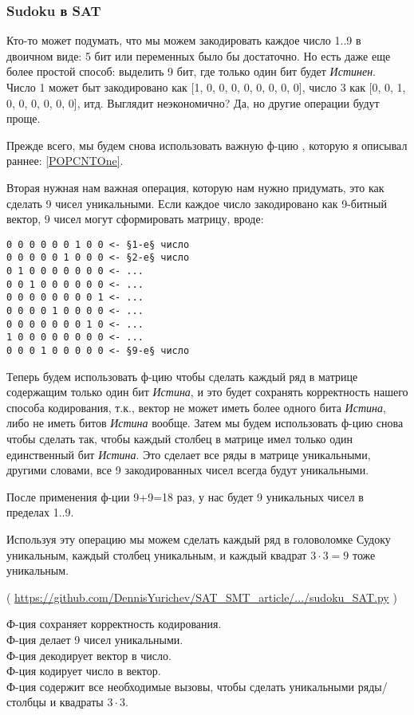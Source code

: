 \subsubsection{Sudoku в SAT}
\label{Sudoku_SAT}

Кто-то может подумать, что мы можем закодировать каждое число 1..9 в двоичном виде: 5 бит или переменных было бы достаточно.
Но есть даже еще более простой способ: выделить 9 бит, где только один бит будет \textit{Истинен}.
Число 1 может быт закодировано как [1, 0, 0, 0, 0, 0, 0, 0, 0], число 3 как [0, 0, 1, 0, 0, 0, 0, 0, 0], итд.
Выглядит неэкономично? Да, но другие операции будут проще.

Прежде всего, мы будем снова использовать важную ф-цию , которую я описывал раннее: \ref{POPCNTOne}.

Вторая нужная нам важная операция, которую нам нужно придумать, это как сделать 9 чисел уникальными.
Если каждое число закодировано как 9-битный вектор, 9 чисел могут сформировать матрицу, вроде:

\begin{lstlisting}
0 0 0 0 0 0 1 0 0 <- §1-е§ число
0 0 0 0 0 1 0 0 0 <- §2-е§ число
0 1 0 0 0 0 0 0 0 <- ...
0 0 1 0 0 0 0 0 0 <- ...
0 0 0 0 0 0 0 0 1 <- ...
0 0 0 0 1 0 0 0 0 <- ...
0 0 0 0 0 0 0 1 0 <- ...
1 0 0 0 0 0 0 0 0 <- ...
0 0 0 1 0 0 0 0 0 <- §9-е§ число
\end{lstlisting}

Теперь будем использовать ф-цию  чтобы сделать каждый ряд в матрице содержащим только один бит \textit{Истина},
и это будет сохранять корректность нашего способа кодирования, т.к., вектор не может иметь более одного бита \textit{Истина},
либо не иметь битов \textit{Истина} вообще.
Затем мы будем использовать ф-цию  снова чтобы сделать так, чтобы каждый столбец в матрице имел только
один единственный бит \textit{Истина}.
Это сделает все ряды в матрице уникальными, другими словами, все 9 закодированных чисел всегда будут уникальными.

После применения ф-ции  9+9=18 раз, у нас будет 9 уникальных чисел в пределах 1..9.

Используя эту операцию мы можем сделать каждый ряд в головоломке Судоку уникальным, каждый столбец уникальным,
и каждый квадрат $3 \cdot 3=9$ тоже уникальным.


( \url{https://github.com/DennisYurichev/SAT_SMT_article/.../sudoku_SAT.py} )

Ф-ция  сохраняет корректность кодирования.\\
Ф-ция  делает 9 чисел уникальными.\\
Ф-ция  декодирует вектор в число.\\
Ф-ция  кодирует число в вектор.\\
Ф-ция  содержит все необходимые вызовы, чтобы сделать уникальными ряды/столбцы и квадраты $3\cdot 3$.

